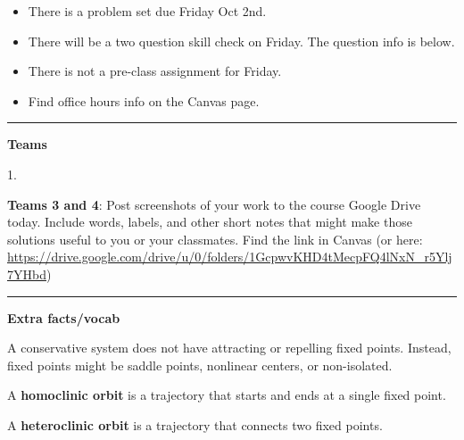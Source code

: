 \documentclass[12pt,letterpaper,noanswers]{exam}
\begin{document}
 \pdfpageheight 11in 
  \pdfpagewidth 8.5in

\noindent 





\begin{itemize}
\itemsep0em
    \item There is a problem set due Friday Oct 2nd.
    \item There will be a two question skill check on Friday.  The question info is below.
    \item There is not a pre-class assignment for Friday.
    \item Find office hours info on the Canvas page.
\end{itemize}

\hrule
\vspace{0.2cm}





\noindent\textbf{Teams}

\begin{multicols}{2}
1. 

\end{multicols}

\noindent \textbf{Teams 3 and 4}: Post screenshots of your work to the course Google Drive today.  Include words, labels, and other short notes that might make those solutions useful to you or your classmates.  Find the link in Canvas (or here: \url{https://drive.google.com/drive/u/0/folders/1GcpwvKHD4tMecpFQ4lNxN_r5Ylj7YHbd})


\vspace{0.2cm}
\hrule
\vspace{0.2cm}

\noindent\textbf{Extra facts/vocab}

\begin{tcolorbox}
A conservative system does not have attracting or repelling fixed points.  Instead, fixed points might be saddle points, nonlinear centers, or non-isolated.

A \textbf{homoclinic orbit} is a trajectory that starts and ends at a single fixed point.

A \textbf{heteroclinic orbit} is a trajectory that connects two fixed points.
\end{tcolorbox}
\end{document}
